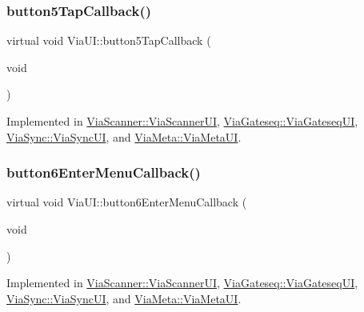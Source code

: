 \mbox{\label{class_via_u_i_a5066c22385f31c24ec939d680a66a628}} 
\subsubsection{\texorpdfstring{button5\+Tap\+Callback()}{button5TapCallback()}}
{\footnotesize\ttfamily virtual void Via\+U\+I\+::button5\+Tap\+Callback (\begin{DoxyParamCaption}\item[{void}]{ }\end{DoxyParamCaption})\hspace{0.3cm}{\ttfamily [pure virtual]}}



Implemented in \mbox{\hyperlink{class_via_scanner_1_1_via_scanner_u_i_a10bef1a488e628c198e07bc56690199c}{Via\+Scanner\+::\+Via\+Scanner\+UI}}, \mbox{\hyperlink{class_via_gateseq_1_1_via_gateseq_u_i_a0622c45ab381c9bde60480781f90981c}{Via\+Gateseq\+::\+Via\+Gateseq\+UI}}, \mbox{\hyperlink{class_via_sync_1_1_via_sync_u_i_aee833fdc4c2d1e242c1ece302dcaca1b}{Via\+Sync\+::\+Via\+Sync\+UI}}, and \mbox{\hyperlink{class_via_meta_1_1_via_meta_u_i_afab19acc66940324991525af8527d6d9}{Via\+Meta\+::\+Via\+Meta\+UI}}.

\mbox{\label{class_via_u_i_ae59e7ff3a6ba1f641a4a916e47a26513}} 
\subsubsection{\texorpdfstring{button6\+Enter\+Menu\+Callback()}{button6EnterMenuCallback()}}
{\footnotesize\ttfamily virtual void Via\+U\+I\+::button6\+Enter\+Menu\+Callback (\begin{DoxyParamCaption}\item[{void}]{ }\end{DoxyParamCaption})\hspace{0.3cm}{\ttfamily [pure virtual]}}



Implemented in \mbox{\hyperlink{class_via_scanner_1_1_via_scanner_u_i_a94de9ec6e40e16ba7dd8dc0ffb9adc14}{Via\+Scanner\+::\+Via\+Scanner\+UI}}, \mbox{\hyperlink{class_via_gateseq_1_1_via_gateseq_u_i_adf289572ed287fdc4c9ff4029f008b7b}{Via\+Gateseq\+::\+Via\+Gateseq\+UI}}, \mbox{\hyperlink{class_via_sync_1_1_via_sync_u_i_a114ee3916efcf43b16f6265151350e15}{Via\+Sync\+::\+Via\+Sync\+UI}}, and \mbox{\hyperlink{class_via_meta_1_1_via_meta_u_i_a5bcffdfe679b51dbcac0e78dc093c29b}{Via\+Meta\+::\+Via\+Meta\+UI}}.

